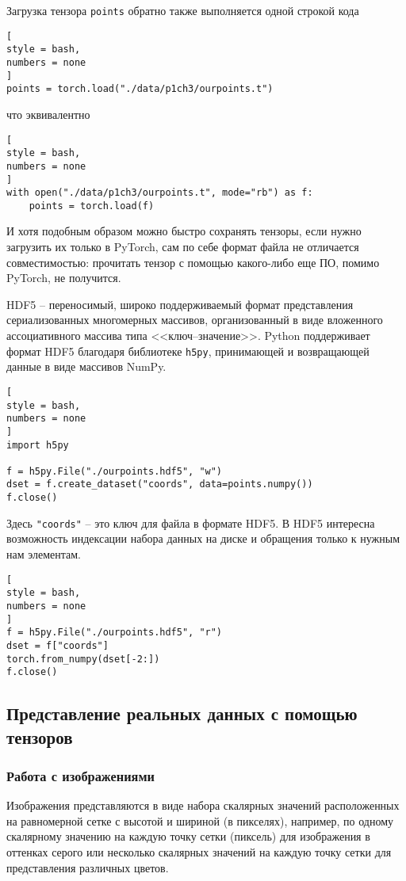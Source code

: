 \documentclass[%
	11pt,
	a4paper,
	utf8,
		]{article}
\begin{document}
Загрузка тензора \verb|points| обратно также выполняется одной строкой кода
\begin{lstlisting}[
style = bash,
numbers = none
]
points = torch.load("./data/p1ch3/ourpoints.t")
\end{lstlisting}
что эквивалентно
\begin{lstlisting}[
style = bash,
numbers = none
]
with open("./data/p1ch3/ourpoints.t", mode="rb") as f:
    points = torch.load(f)
\end{lstlisting}

И хотя подобным образом можно быстро сохранять тензоры, если нужно загрузить их только в PyTorch, сам по себе формат файла не отличается совместимостью: прочитать тензор с помощью какого-либо еще ПО, помимо PyTorch, не получится.

HDF5 -- переносимый, широко поддерживаемый формат представления сериализованных многомерных массивов, организованный в виде вложенного ассоциативного массива типа <<ключ--значение>>. Python поддерживает формат HDF5 благодаря библиотеке \verb|h5py|, принимающей и возвращающей данные в виде массивов NumPy.
\begin{lstlisting}[
style = bash,
numbers = none
]
import h5py

f = h5py.File("./ourpoints.hdf5", "w")
dset = f.create_dataset("coords", data=points.numpy())
f.close()
\end{lstlisting}

Здесь \verb|"coords"| -- это ключ для файла в формате HDF5. В HDF5 интересна возможность индексации набора данных на диске и обращения только к нужным нам элементам. 
\begin{lstlisting}[
style = bash,
numbers = none
]
f = h5py.File("./ourpoints.hdf5", "r")
dset = f["coords"]
torch.from_numpy(dset[-2:])
f.close()
\end{lstlisting}

\subsection{Представление реальных данных с помощью тензоров}

\subsubsection{Работа с изображениями}

Изображения представляются в виде набора скалярных значений расположенных на равномерной сетке с высотой и шириной (в пикселях), например, по одному скалярному значению на каждую точку сетки (пиксель) для изображения в оттенках серого или несколько скалярных значений на каждую точку сетки для представления различных цветов.
\end{document}
